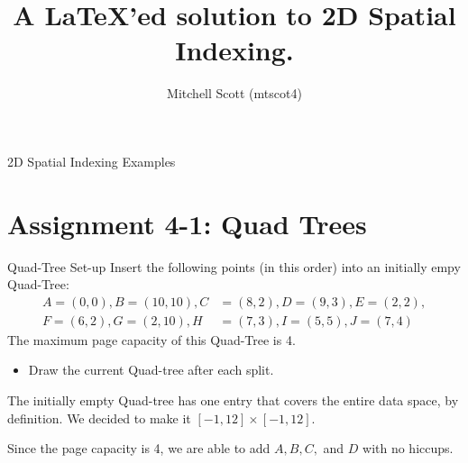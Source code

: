 \documentclass{beamer}
\title{A \LaTeX'ed solution to 2D Spatial Indexing.}
\author{Mitchell Scott (mtscot4)}
\begin{document}
	\begin{frame}[plain]
		\maketitle
	\end{frame}
	\begin{frame}{2D Spatial Indexing Examples}
		\tableofcontents
	\end{frame}
	\section{Assignment 4-1: Quad Trees}
	\begin{frame}{Quad-Tree Set-up}
		Insert the following points (in this order) into an initially empy Quad-Tree:
		\begin{align*}
			A = (0,0), B = (10,10), C &= (8,2), D = (9,3), E = (2,2),\\
			F = (6,2), G = (2,10), H &= (7,3), I = (5,5), J = (7,4)
		\end{align*}
		The maximum page capacity of this Quad-Tree is 4.
		\begin{itemize}
			\item Draw the current Quad-tree after each split.
		\end{itemize}
	\end{frame}
	\begin{frame}{The initially empty Quad-tree has one entry that covers the entire data space, by definition. We decided to make it $[-1,12]\times [-1,12]$.}
		\begin{center}
		\end{center}
		
	\end{frame}
	\begin{frame}{Since the page capacity is 4, we are able to add $A,B,C,$ and $D$ with no hiccups.}
		\begin{center}
		\end{center}
	\end{frame}
\end{document}
